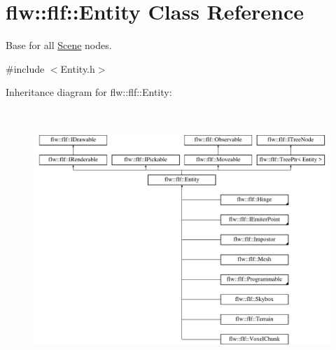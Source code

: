 \hypertarget{classflw_1_1flf_1_1Entity}{}\section{flw\+:\+:flf\+:\+:Entity Class Reference}
\label{classflw_1_1flf_1_1Entity}


Base for all \hyperlink{classflw_1_1flf_1_1Scene}{Scene} nodes.  




{\ttfamily \#include $<$Entity.\+h$>$}

Inheritance diagram for flw\+:\+:flf\+:\+:Entity\+:\begin{figure}[H]
\begin{center}
\leavevmode
\includegraphics[height=9.871795cm]{classflw_1_1flf_1_1Entity}
\end{center}
\end{figure}
